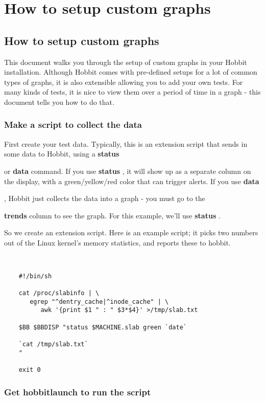 \chapter{How to setup custom graphs}
\label{chap:How to setup custom graphs}

\section{How to setup custom graphs}
 This document walks you through the setup of custom graphs in your
 Hobbit installation. Although Hobbit comes with pre-defined setups
 for a lot of common types of graphs, it is also extensible allowing
 you to add your own tests. For many kinds of tests, it is nice to
 view them over a period of time in a graph - this document tells you
 how to do that. \subsection{Make a script to collect the data}




 First create your test data. Typically, this is an extension script
 that sends in some data to Hobbit, using a \textbf{status}

 or \textbf{data}
 command. If you use \textbf{status}
, it will show up as a separate column on the display, with a
 green/yellow/red color that can trigger alerts. If you use
 \textbf{data}

, Hobbit just collects the data into a graph - you must go to the

 \textbf{trends}
 column to see the graph. For this example, we'll use \textbf{status}
.


 So we create an extension script. Here is an example script; it picks
 two numbers out of the Linux kernel's memory statistics, and reports
 these to hobbit. 

\begin{verbatim}


	#!/bin/sh

	cat /proc/slabinfo | \
	   egrep "^dentry_cache|^inode_cache" | \
	      awk '{print $1 " : " $3*$4}' >/tmp/slab.txt

	$BB $BBDISP "status $MACHINE.slab green `date`

	`cat /tmp/slab.txt`
	"

	exit 0

\end{verbatim}

\subsection{Get hobbitlaunch to run the script}



